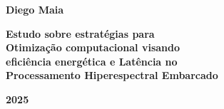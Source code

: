 \documentclass[12pt,Final,Portugues]{tese-FT}
\begin{document}
\begin{titlepage}
\thispagestyle{empty}
\centering

\vspace*{0.25\textheight}

{\LARGE\textbf{Diego Maia}}

\vspace{0.15\textheight}

{\Large\textbf{Estudo sobre estratégias para\\[0.5em]
Otimização computacional visando\\[0.5em]
eficiência energética e Latência no\\[0.5em]
Processamento Hiperespectral Embarcado}}

\vfill

{\large\textbf{2025}}

\vspace*{0.1\textheight}

\end{titlepage}



\end{document}
